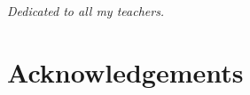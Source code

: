 \cleardoublepage
\pagestyle{empty}
\begin{center}
  \vspace*{0.3\paperheight}
  \textit{Dedicated to all my teachers.}
\end{center}
\pagestyle{fancy}

\chapter*{Acknowledgements}

\blindtext